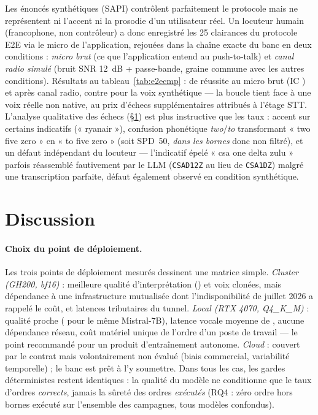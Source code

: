 \documentclass[10pt,a4paper]{article}
\newcommand{\syst}[1]{\texttt{#1}}
\begin{document}
Les énoncés synthétiques (SAPI) contrôlent parfaitement le protocole mais ne
représentent ni l'accent ni la prosodie d'un utilisateur réel. Un locuteur
humain (francophone, non contrôleur) a donc enregistré les 25 clairances du
protocole E2E via le micro de l'application, rejouées dans la chaîne exacte
du banc en deux conditions : \emph{micro brut} (ce que l'application entend
au push-to-talk) et \emph{canal radio simulé} (bruit SNR 12~dB +
passe-bande, graine commune avec les autres conditions). Résultats au
tableau~\ref{tab:e2ecmp} : \nHumMicro{} de réussite au micro brut
(IC \nHumMicroIC) et \nHumRadio{} après canal radio, contre \nEEVoix{} pour
la voix synthétique --- la boucle tient face à une voix réelle non native,
au prix d'échecs supplémentaires attribués à l'étage STT. L'analyse
qualitative des échecs (\S\ref{sec:discussion}) est plus instructive que
les taux : accent sur certains indicatifs (« ryanair »), confusion
phonétique \emph{two}/\emph{to} transformant « two five zero » en
« to five zero » (soit SPD~50, \emph{dans les bornes} donc non filtré), et
un défaut indépendant du locuteur --- l'indicatif épelé « csa one delta
zulu » parfois réassemblé fautivement par le LLM (\syst{CSAD12Z} au lieu de
\syst{CSA1DZ}) malgré une transcription parfaite, défaut également observé
en condition synthétique.

\section{Discussion}
\label{sec:discussion}

\paragraph{Choix du point de déploiement.} Les trois points de déploiement
mesurés dessinent une matrice simple. \emph{Cluster (GH200, bf16)} :
meilleure qualité d'interprétation (\nLLMRomeoAcc) et voix clonées, mais
dépendance à une infrastructure mutualisée dont l'indisponibilité de
juillet 2026 a rappelé le coût, et latences tributaires du tunnel.
\emph{Local (RTX 4070, Q4\_K\_M)} : qualité proche (\nLLMBestAcc{} pour le
même Mistral-7B), latence vocale moyenne de \nEELatMoy, aucune dépendance
réseau, coût matériel unique de l'ordre d'un poste de travail --- le point
recommandé pour un produit d'entraînement autonome. \emph{Cloud} : couvert
par le contrat mais volontairement non évalué (biais commercial,
variabilité temporelle) ; le banc est prêt à l'y soumettre. Dans tous les
cas, les gardes déterministes restent identiques : la qualité du modèle ne
conditionne que le taux d'ordres \emph{corrects}, jamais la sûreté des
ordres \emph{exécutés} (RQ4 : zéro ordre hors bornes exécuté sur l'ensemble
des campagnes, tous modèles confondus).
\end{document}
